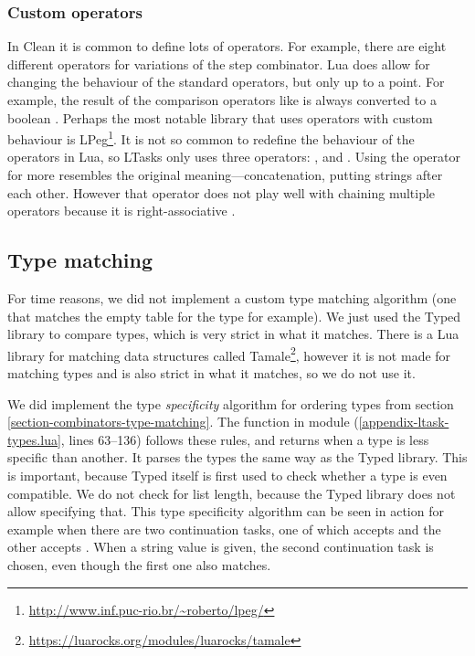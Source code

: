 \subsubsection{Custom operators}
In Clean it is common to define lots of operators. For example, there are eight different operators for variations of the step combinator. Lua does allow for changing the behaviour of the standard operators, but only up to a point. For example, the result of the comparison operators like \lua{<} is always converted to a boolean \cite{luareferencemanual}. Perhaps the most notable library that uses operators with custom behaviour is LPeg\footnote{\url{http://www.inf.puc-rio.br/~roberto/lpeg/}}. It is not so common to redefine the behaviour of the operators in Lua, so LTasks only uses three operators: \lua{~}, \lua{&} and \lua{|}. Using the  operator for  more resembles the original meaning---concatenation, putting strings after each other. However that operator does not play well with chaining multiple operators because it is right-associative \cite[\S 3.4.8]{luareferencemanual}.

\subsection{Type matching}
For time reasons, we did not implement a custom type matching algorithm (one that matches the empty table \lua{{}} for the type  for example). We just used the Typed library to compare types, which is very strict in what it matches. There is a Lua library for matching data structures called Tamale\footnote{\url{https://luarocks.org/modules/luarocks/tamale}}, however it is not made for matching types and is also strict in what it matches, so we do not use it.

We did implement the type \textit{specificity} algorithm for ordering types from section \ref{section-combinators-type-matching}. The function  in module  (\ref{appendix-ltask-types.lua}, lines 63--136) follows these rules, and returns  when a type is less specific than another. It parses the types the same way as the Typed library. This is important, because Typed itself is first used to check whether a type is even compatible. We do not check for list length, because the Typed library does not allow specifying that. This type specificity algorithm can be seen in action for example when there are two continuation tasks, one of which accepts  and the other accepts . When a string value is given, the second continuation task is chosen, even though the first one also matches.

